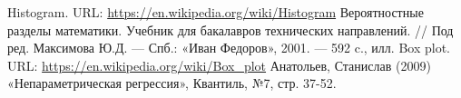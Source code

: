 
\begin{thebibliography}{}
      Histogram. URL: \url{https://en.wikipedia.org/wiki/Histogram}
      Вероятностные разделы математики. Учебник для бакалавров технических направлений. // Под ред. Максимова Ю.Д. — Спб.: «Иван Федоров», 2001. — 592 c., илл.
      Box plot. URL: \url{https://en.wikipedia.org/wiki/Box_plot}
      Анатольев, Станислав (2009) «Непараметрическая регрессия», Квантиль, №7, стр. 37-52.
\end{thebibliography}